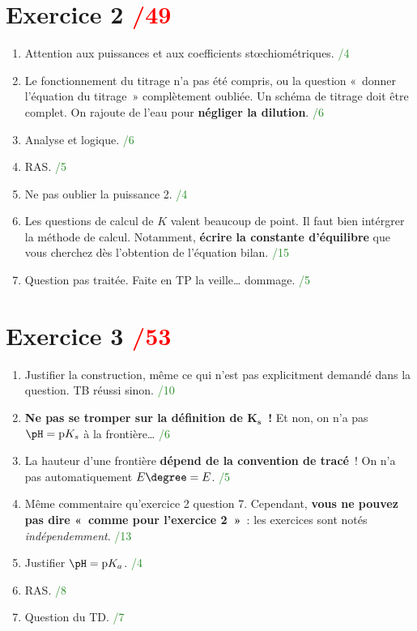 \documentclass[a4paper, 12pt, final, garamond]{book}
\begin{document}
\section{Exercice 2 \hfill \textcolor{red}{/49}}
\begin{enumerate}
  \item Attention aux puissances et aux coefficients stœchiométriques.
    \hfill \textcolor{ForestGreen}{/4}
  \item Le fonctionnement du titrage n'a pas été compris, ou la question
    «~donner l'équation du titrage~» complètement oubliée. Un schéma de titrage
    doit être complet. On rajoute de l'eau pour \textbf{négliger la dilution}.
    \hfill \textcolor{ForestGreen}{/6}
  \item Analyse et logique.
    \hfill \textcolor{ForestGreen}{/6}
  \item RAS.
    \hfill \textcolor{ForestGreen}{/5}
  \item Ne pas oublier la puissance 2.
    \hfill \textcolor{ForestGreen}{/4}
  \item Les questions de calcul de $K$ valent beaucoup de point. Il faut bien
    intérgrer la méthode de calcul. Notamment, \textbf{écrire la constante
    d'équilibre} que vous cherchez dès l'obtention de l'équation bilan.
    \hfill \textcolor{ForestGreen}{/15}
  \item Question pas traitée. Faite en TP la veille… dommage.
    \hfill \textcolor{ForestGreen}{/5}
\end{enumerate}

\section{Exercice 3 \hfill \textcolor{red}{/53}}
\begin{enumerate}
  \item Justifier la construction, même ce qui n'est pas explicitment demandé
    dans la question. TB réussi sinon.
    \hfill \textcolor{ForestGreen}{/10}
  \item \textbf{Ne pas se tromper sur la définition de $\mathbf{K_s}$~!} Et non,
    on n'a pas $\pH = \mathrm{p}K_s$ à la frontière…
    \hfill \textcolor{ForestGreen}{/6}
  \item La hauteur d'une frontière \textbf{dépend de la convention de tracé}~!
    On n'a pas automatiquement $E\degree = E$.
    \hfill \textcolor{ForestGreen}{/5}
  \item Même commentaire qu'exercice 2 question 7. Cependant, \textbf{vous ne
    pouvez pas dire «~comme pour l'exercice 2~»}~: les exercices sont notés
    \textit{indépendemment}.
    \hfill \textcolor{ForestGreen}{/13}
  \item Justifier $\pH = \mathrm{p}K_a$.
    \hfill \textcolor{ForestGreen}{/4}
  \item RAS.
    \hfill \textcolor{ForestGreen}{/8}
  \item Question du TD.
    \hfill \textcolor{ForestGreen}{/7}
\end{enumerate}
\end{document}
